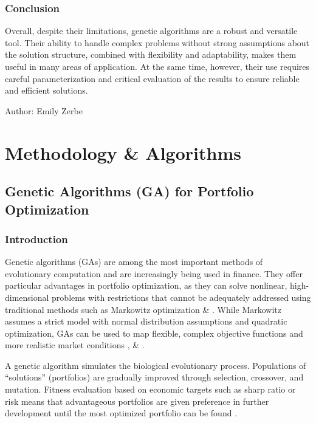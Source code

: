 \documentclass{agasthesis}
\begin{document}
\subsection{Conclusion}
Overall, despite their limitations, genetic algorithms are a robust and versatile tool. Their ability to handle complex problems without strong assumptions about the solution structure, 
combined with flexibility and adaptability, makes them useful in many areas of application. At the same time, however, their use requires careful parameterization and critical evaluation 
of the results to ensure reliable and efficient solutions.

Author: Emily Zerbe

\chapter{Methodology & Algorithms}
\section{Genetic Algorithms (GA) for Portfolio Optimization}
\subsection{Introduction}
Genetic algorithms (GAs) are among the most important methods of evolutionary computation and are increasingly being used in finance. 
They offer particular advantages in portfolio optimization, as they can solve nonlinear, high-dimensional problems with restrictions 
that cannot be adequately addressed using traditional methods such as Markowitz optimization \cite{li_application_2022} \& \cite{kalayci_review_2017}. 
While Markowitz assumes a strict model with normal distribution assumptions and quadratic optimization, GAs can be used to map flexible, 
complex objective functions and more realistic market conditions \cite{chang_heuristics_2000}, \cite{mangram_simplified_2013} \& \cite[p. 206-207]{soldatos_big_2022}. 

A genetic algorithm simulates the biological evolutionary process. Populations of “solutions” (portfolios) are gradually improved through selection, 
crossover, and mutation. Fitness evaluation based on economic targets such as sharp ratio or risk means that advantageous portfolios are given 
preference in further development until the most optimized portfolio can be found \cite[p. 203-213]{soldatos_big_2022}.
\end{document}
